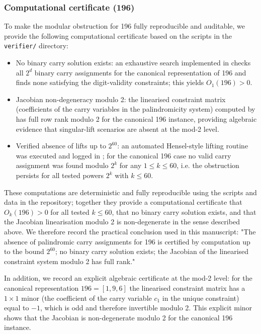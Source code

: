 \documentclass[12pt,a4paper]{article}
\begin{document}
\subsubsection*{Computational certificate (196)}
To make the modular obstruction for 196 fully reproducible and auditable, we provide the following computational certificate based on the scripts in the \texttt{verifier/} directory:
\begin{itemize}
\item No binary carry solution exists: an exhaustive search implemented in \texttt{} checks all $2^d$ binary carry assignments for the canonical representation of 196 and finds none satisfying the digit-validity constraints; this yields $O_1(196)>0$.
\item Jacobian non-degeneracy modulo 2: the linearised constraint matrix (coefficients of the carry variables in the palindromicity system) computed by \texttt{} has full row rank modulo 2 for the canonical 196 instance, providing algebraic evidence that singular-lift scenarios are absent at the mod-2 level.
\item Verified absence of lifts up to $2^{60}$: an automated Hensel-style lifting routine was executed and logged in \texttt{}; for the canonical 196 case no valid carry assignment was found modulo $2^k$ for any $1\le k\le 60$, i.e. the obstruction persists for all tested powers $2^k$ with $k\le 60$.
\end{itemize}

These computations are deterministic and fully reproducible using the scripts and data in the repository; together they provide a computational certificate that $O_k(196)>0$ for all tested $k\le 60$, that no binary carry solution exists, and that the Jacobian linearisation modulo 2 is non-degenerate in the sense described above. We therefore record the practical conclusion used in this manuscript: "The absence of palindromic carry assignments for 196 is certified by computation up to the bound $2^{60}$; no binary carry solution exists; the Jacobian of the linearised constraint system modulo 2 has full rank."

In addition, we record an explicit algebraic certificate at the mod-2 level: for the canonical representation $196=[1,9,6]$ the linearised constraint matrix has a $1\times1$ minor (the coefficient of the carry variable $c_1$ in the unique constraint) equal to $-1$, which is odd and therefore invertible modulo 2. This explicit minor shows that the Jacobian is non-degenerate modulo 2 for the canonical 196 instance.
\end{document}
